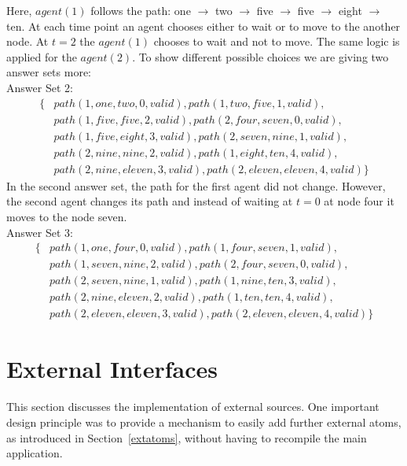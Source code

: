 \documentclass[a4paper, titlepage]{article}
\begin{document}
Here, $\mathit{agent(1)}$ follows the path:
one $\rightarrow$ two $\rightarrow$ five $\rightarrow$ five 
$\rightarrow$ eight $\rightarrow$ ten. At each time 
point an agent chooses either to wait or to move to 
the another node. At $t=2$ the $\mathit{agent(1)}$ chooses 
to wait and not to move. The same logic is applied for the 
$\mathit{agent(2)}$. To show different possible choices we are 
giving two answer sets more:
\\Answer Set 2:
\begin{align*}
\{ & path(1,one,two,0,valid),path(1,two,five,1,valid),
\\ & path(1,five,five,2,valid),path(2,four,seven,0,valid),
\\ & path(1,five,eight,3,valid),path(2,seven,nine,1,valid),
\\ & path(2,nine,nine,2,valid),path(1,eight,ten,4,valid),
\\ & 
path(2,nine,eleven,3,valid),path(2,eleven,eleven,4,valid)\}
\end{align*}
In the second answer set, the path for the first agent did not 
change. However, the second agent changes its path and instead 
of waiting at $t=0$ at node four it moves to the node 
seven.  
\\Answer Set 3:
\begin{align*}
\{ & path(1,one,four,0,valid), path(1,four,seven,1,valid),
\\ & path(1,seven,nine,2,valid), path(2,four,seven,0,valid),
\\ & path(2,seven,nine,1,valid), 
path(1,nine,ten,3,valid),
\\ & path(2,nine,eleven,2,valid), path(1,ten,ten,4,valid),
\\ & 
path(2,eleven,eleven,3,valid),path(2,eleven,eleven,4,valid) 
\}
\end{align*} 

\section{External Interfaces}
\label{sec:externalInterfaces}
This section discusses the implementation of external sources. One important design principle was to provide a 
mechanism to easily add further external atoms, as introduced in Section~\ref{extatoms}, without 
having to recompile the main application.
 
\end{document}

